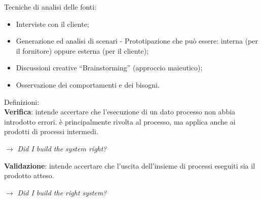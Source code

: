 Tecniche di analisi delle fonti:
\begin{itemize}
\item Interviste con il cliente;
\item Generazione ed analisi di scenari - Prototipazione che può essere: interna (per il fornitore) oppure esterna (per il cliente);
\item Discussioni creative ``Brainstorming'' (approccio maieutico);
\item Osservazione dei comportamenti e dei bisogni.
\end{itemize}
Definizioni:\\
\textbf{Verifica}: intende accertare che l'esecuzione di un dato processo non abbia introdotto errori. è principalmente rivolta al processo, ma applica anche ai prodotti di processi intermedi. 
\begin{center}
$\rightarrow$ \textit{Did I build the system right?}
\end{center}
\textbf{Validazione}: intende accertare che l'uscita dell'insieme di processi eseguiti sia il prodotto atteso.
\begin{center}
 $\rightarrow$ \textit{Did I build the right system?}
\end{center}